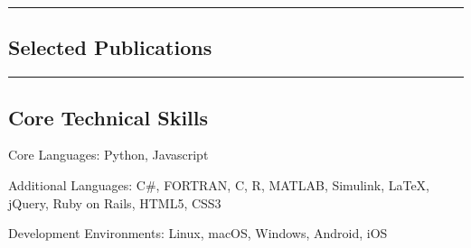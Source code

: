 \documentclass[10pt,letterpaper]{article}
\newenvironment{indentsection}[1]%
{\begin{list}{}%
	{\setlength{\leftmargin}{#1}}%
	\item[]%
}
{\end{list}}
\newcommand{\CPP}
{C\nolinebreak[4]\hspace{-.05em}\raisebox{.22ex}{\footnotesize\bf ++}}
\begin{document}
\hrule
\vspace{-0.2em}
\subsection*{Selected Publications}

\nocite{*}
\renewcommand{\section}[2]{}%


\vspace{0.4em}
\hrule
\vspace{-0.2em}
\subsection*{Core Technical Skills}

\begin{indentsection}{\parindent}
	\begin{description*}
		\item[Core Languages:]
		Python, Javascript
		\item[Additional Languages:]
		C\#, FORTRAN, \CPP, R, MATLAB, Simulink, \LaTeX, jQuery, Ruby on Rails, HTML5, CSS3
		\item[Development Environments:]
		Linux, macOS, Windows, Android, iOS
	\end{description*}
\end{indentsection}
\end{document}

